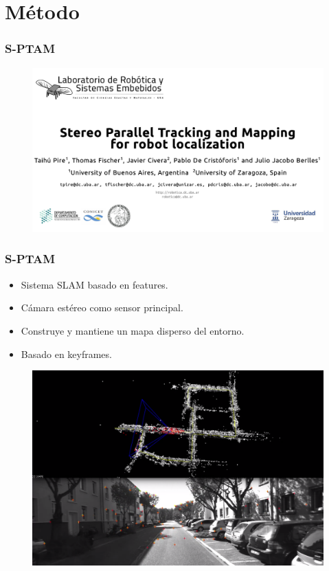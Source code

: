 \section{Método}


\begin{frame}
\frametitle{S-PTAM}
\begin{figure}[htb]
	\centering
	\includegraphics[width=1.0\columnwidth]{method/portada-sptam-kitti-video.pdf}
	\hfill
\end{figure}

\end{frame}


\begin{frame}
\frametitle{S-PTAM}

\begin{itemize}
\item Sistema SLAM basado en features.
\item Cámara estéreo como sensor principal.
\item Construye y mantiene un mapa disperso del entorno.
\item Basado en keyframes.
\end{itemize}

\begin{figure}[htb]
	\centering
	\includegraphics[width=0.8\columnwidth]{method/sptam_kitti.png}
\end{figure}

\end{frame}


